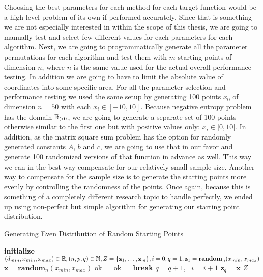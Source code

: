 \documentclass[a4paper,english,titlepage,12pt]{article}
\newcommand{\vect}[1]{\ensuremath{\mathbf{#1}}}
\newcommand{\norm}[1]{\ensuremath\Vert #1 \Vert}
\newcommand{\R}{\ensuremath\mathbb{R}}
\newcommand{\N}{\ensuremath\mathbb{N}}
\begin{document}
Choosing the best parameters for each method for each target function would be a high level problem of its own if performed accurately. Since that is something we are not especially interested in within the scope of this thesis, we are going to manually test and select few different values for each parameters for each algorithm. Next, we are going to programmatically generate all the parameter permutations for each algorithm and test them with $m$ starting points of dimension $n$, where $n$ is the same value used for the actual overall performance testing. In addition we are going to have to limit the absolute value of coordinates into some specific area. For all the parameter selection and performance testing we used the same setup by generating 100 points $x_0$ of dimension $n = 50$ with each $x_i \in [-10, 10]$. Because negative entropy problem has the domain $\R_{>0}$, we are going to generate a separate set of 100 points otherwise similar to the first one but with positive values only: $x_i \in ]0, 10]$. In addition, as the matrix square sum problem has the option for randomly generated constants $A$, $b$ and $c$, we are going to use that in our favor and generate 100 randomized versions of that function in advance as well. This way we can in the best way compensate for our relatively small sample size. Another way to compensate for the sample size is to generate the starting points more evenly by controlling the randomness of the points. Once again, because this is something of a completely different research topic to handle perfectly, we ended up using non-perfect but simple algorithm for generating our starting point distribution.

\begin{algorithm}[H]
\caption{Generating Even Distribution of Random Starting Points}
\label{alg_x0_distribution}
\begin{algorithmic}[1]
\STATE \textbf{initialize} $(d_{min}, x_{min}, x_{max}) \in \R, (n, p, q) \in \N, Z = \{\vect{z}_1, \dots ,\vect{z}_m\}, i = 0, q = 1, \vect{z}_1 = \mathbf{random}_{n}(x_{min}, x_{max})$
    \STATE $\vect{x} = \mathbf{random}_{n}(x_{min}, x_{max})$
    \STATE $\mathrm{ok} =$ \TRUE
        \IF{$\norm{\vect{z}_j - \vect{x}} < d_{min}$}
            \STATE $\mathrm{ok} = $ \FALSE
            \STATE \textbf{break}
        \ENDIF
    \ENDFOR
        \STATE $q = q + 1$, \ $i = i + 1$
        \STATE $\vect{z}_q = \vect{x}$
    \ENDIF
\ENDWHILE
\RETURN $Z$
\end{algorithmic}
\end{algorithm}
\end{document}
